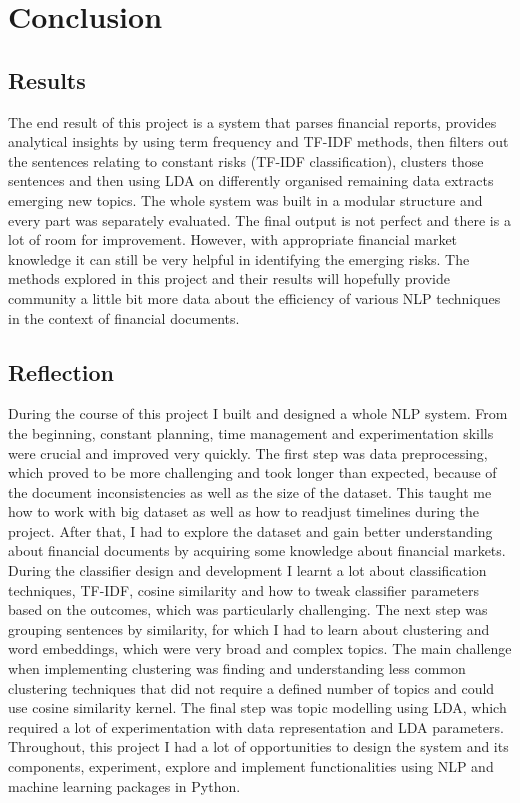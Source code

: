 \chapter{Conclusion}

\section{Results}
The end result of this project is a system that parses financial reports, provides analytical insights by using term frequency and TF-IDF methods, then filters out the sentences relating to constant risks (TF-IDF classification), clusters those sentences and then using LDA on differently organised remaining data extracts emerging new topics. The whole system was built in a modular structure and every part was separately evaluated. The final output is not perfect and there is a lot of room for improvement. However, with appropriate financial market knowledge it can still be very helpful in identifying the emerging risks. The methods explored in this project and their results will hopefully provide community a little bit more data about the efficiency of various NLP techniques in the context of financial documents.

\section{Reflection}
During the course of this project I built and designed a whole NLP system. From the beginning, constant planning, time management and experimentation skills were crucial and improved very quickly. The first step was data preprocessing, which proved to be more challenging and took longer than expected, because of the document inconsistencies as well as the size of the dataset. This taught me how to work with big dataset as well as how to readjust timelines during the project. After that, I had to explore the dataset and gain better understanding about financial documents by acquiring some knowledge about financial markets. During the classifier design and development I learnt a lot about classification techniques, TF-IDF, cosine similarity and how to tweak classifier parameters based on the outcomes, which was particularly challenging. The next step was grouping sentences by similarity, for which I had to learn about clustering and word embeddings, which were very broad and complex topics. The main challenge when implementing clustering was finding and understanding less common clustering techniques that did not require a defined number of topics and could use cosine similarity kernel. The final step was topic modelling using LDA, which required a lot of experimentation with data representation and LDA parameters. Throughout, this project I had a lot of opportunities to design the system and its components, experiment, explore and implement functionalities using NLP and machine learning packages in Python.

